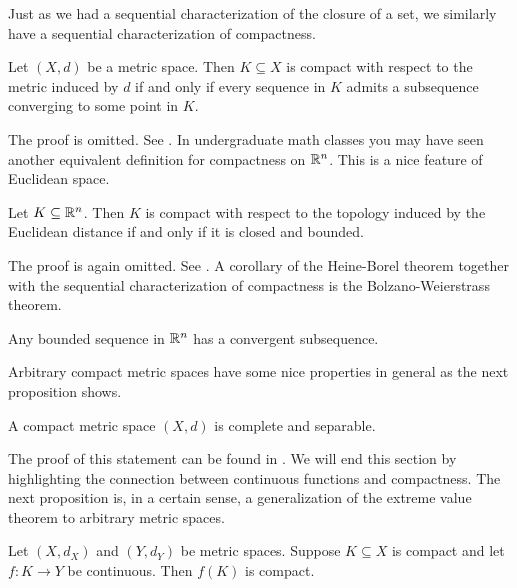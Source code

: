 \documentclass{article}
\begin{document}
Just as we had a sequential characterization of the closure of a set, we similarly have a sequential characterization of compactness. 

\begin{theorem}
Let $(X,d)$ be a metric space. Then $K\subseteq X$ is compact with respect to the metric induced by $d$ if and only if every sequence in $K$ admits a subsequence converging to some point in $K$.
\end{theorem}

The proof is omitted. See \cite[Theorem 2.5.10]{tastetopology}. In undergraduate math classes you may have seen another equivalent definition for compactness on ${\mathbb{R}}^n$. This is a nice feature of Euclidean space.

\begin{theorem}
Let $K\subseteq {\mathbb{R}}^n$. Then $K$ is compact with respect to the topology induced by the Euclidean distance if and only if it is closed and bounded.
\end{theorem}

The proof is again omitted. See \cite[Corollary 2.5.12]{tastetopology}. A corollary of the Heine-Borel theorem together with the sequential characterization of compactness is the Bolzano-Weierstrass theorem.

\begin{corollary}
Any bounded sequence in ${\mathbb{R}}^n$ has a convergent subsequence.
\end{corollary}

Arbitrary compact metric spaces have some nice properties in general as the next proposition shows.

\begin{proposition}
    A compact metric space $(X,d)$ is complete and separable.
\end{proposition}

The proof of this statement can be found in \cite[Proposition 2.5.8]{tastetopology}. We will end this section by highlighting the connection between continuous functions and compactness. The next proposition is, in a certain sense, a generalization of the extreme value theorem to arbitrary metric spaces.

\begin{proposition}
Let $(X,d_X)$ and $(Y, d_Y)$ be metric spaces. Suppose $K\subseteq X$ is compact and let $f\colon K \to Y$ be continuous. Then $f(K)$ is compact. 
\end{proposition}
\end{document}
